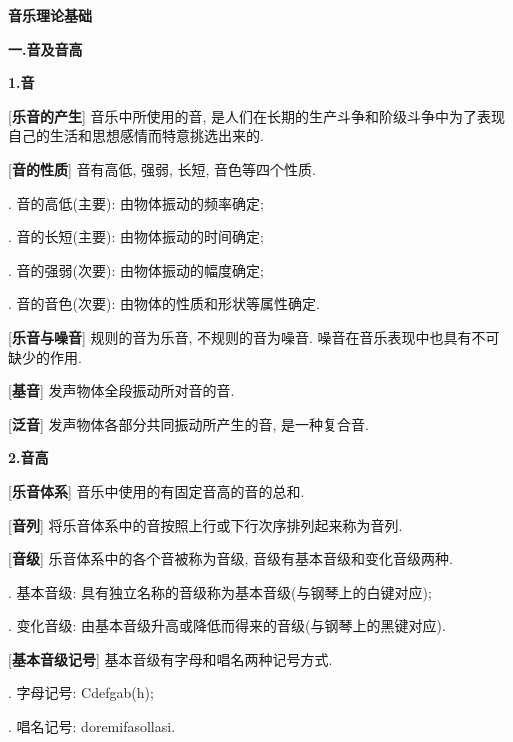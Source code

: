 

\begin{center} 
 \Large \textbf{音乐理论基础}\par
 \textbf{一.音及音高}
\end{center}

\large 
\begin{center}
 \textbf{1.音}\\
\end{center}

[\textbf{乐音的产生}] 音乐中所使用的音, 是人们在长期的生产斗争和阶级斗争中为了表现自己的生活和思想感情而特意挑选出来的.\par

[\textbf{音的性质}] 音有高低, 强弱, 长短, 音色等四个性质.\par
{}. 音的高低(主要): 由物体振动的频率确定;\par
{}. 音的长短(主要): 由物体振动的时间确定;\par
{}. 音的强弱(次要): 由物体振动的幅度确定;\par
{}. 音的音色(次要): 由物体的性质和形状等属性确定.\par

[\textbf{乐音与噪音}] 规则的音为乐音, 不规则的音为噪音. 噪音在音乐表现中也具有不可缺少的作用.\par

[\textbf{基音}] 发声物体全段振动所对音的音.\par

[\textbf{泛音}] 发声物体各部分共同振动所产生的音, 是一种复合音.\par

\begin{center}
 \textbf{2.音高}\\
\end{center}

[\textbf{乐音体系}] 音乐中使用的有固定音高的音的总和.\par

[\textbf{音列}] 将乐音体系中的音按照上行或下行次序排列起来称为音列.\par

[\textbf{音级}] 乐音体系中的各个音被称为音级, 音级有基本音级和变化音级两种.\par
{}. 基本音级: 具有独立名称的音级称为基本音级(与钢琴上的白键对应);\par
{}. 变化音级: 由基本音级升高或降低而得来的音级(与钢琴上的黑键对应).\par

[\textbf{基本音级记号}] 基本音级有字母和唱名两种记号方式.\par
{}. 字母记号: C\quad d\qquad e\quad f\qquad g\quad a\quad b(h)\quad;\par
{}. 唱名记号: do\quad re\quad mi\quad fa\quad sol\quad la\quad si.\par

